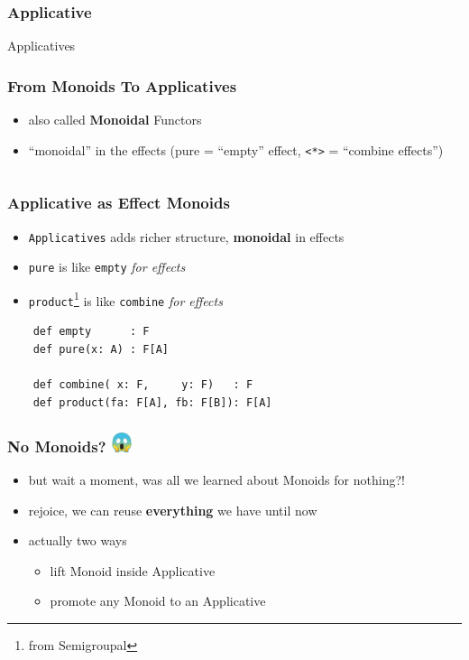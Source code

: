 \documentclass[aspectratio=169]{beamer}
\begin{document}
\begin{frame}
  \frametitle{Applicative}
  \huge
  Applicatives
\end{frame}

\begin{frame}[fragile]
  \frametitle{From Monoids To Applicatives}
  \begin{itemize}
  \item also called \textbf{Monoidal} Functors
  \item ``monoidal'' in the effects (pure = ``empty'' effect, \texttt{<*>} = ``combine effects'')
  \end{itemize}
  \vfill
  \inputminted[fontsize=\small]{scala}{snippets/applicative-def.scala}
\end{frame}

\begin{frame}[fragile]
  \frametitle{Applicative as Effect Monoids}
  \begin{itemize}
  \item \texttt{Applicatives} adds richer structure, \textbf{monoidal} in effects
  \item \texttt{pure} is like \texttt{empty} \textit{for effects}
  \item \texttt{product}\footnote{from Semigroupal} is like \texttt{combine} \textit{for effects}
  \end{itemize}
  \begin{verbatim}
    def empty      : F
    def pure(x: A) : F[A]

    def combine( x: F,     y: F)   : F
    def product(fa: F[A], fb: F[B]): F[A]
  \end{verbatim}
\end{frame}

\begin{frame}
  \frametitle{No Monoids? \includegraphics[width=6mm, valign=c]{static-images/scream.png}}
  \begin{itemize}
  \item but wait a moment, was all we learned about Monoids for nothing?!
  \item rejoice, we can reuse \textbf{everything} we have until now
  \item actually two ways
    \begin{itemize}
    \item lift Monoid inside Applicative
    \item promote any Monoid to an Applicative
    \end{itemize}
  \end{itemize}
\end{frame}
\end{document}
